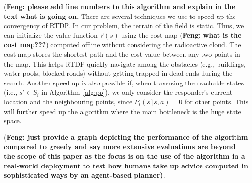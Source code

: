 (\textbf{Feng: please add line numbers to this algorithm and explain in the text what is going on.}
There are several techniques we use to speed up the convergency of
RTDP. In our problem, the terrain of the field is static. Thus, we
can initialize the value function $V(s)$ using the cost map (\textbf{Feng: what is the cost map???})
computed offline without considering the radioactive cloud. The
cost map stores the shortest path and the cost value between any
two points in the map. This helps RTDP quickly navigate among
the obstacles (e.g., buildings, water pools, blocked roads) without
getting trapped in dead-ends during the search. Another speed up is also possible if, when traversing the reachable states (i.e., $s'\in S_i$ in
Algorithm~\ref{alg:pp}), we only consider the responder's current
location and the neighbouring points, since $P_i(s'|s,a) = 0$ for
other points. This will further speed up the algorithm where the
main bottleneck is the huge state space.

(\textbf{Feng: just provide a graph depicting the performance of the algorithm compared to greedy and say more extensive evaluations are beyond the scope of this paper as the focus is on the use of the algorithm in a real-world deployment to test how humans take up advice computed in sophisticated ways by an agent-based planner)}.
